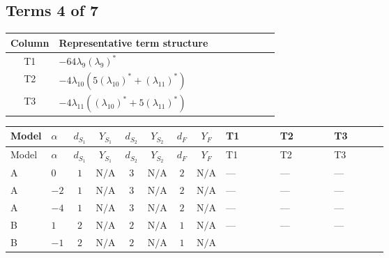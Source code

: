 \documentclass[8pt]{article}
\begin{document}
\begin{landscape}
\subsection*{Terms 4 of 7}
\begin{center}
\begin{tabular}{@{}c >{\raggedright\arraybackslash}p{0.82\linewidth}@{}}
\toprule
Column & Representative term structure \\
\midrule
T1 & \(\displaystyle -64 {\lambda_{9}} \left({\lambda_{9}}\right)^{*}\) \\
\midrule
T2 & \(\displaystyle -4 {\lambda_{10}} (5 \left({\lambda_{10}}\right)^{*}+\left({\lambda_{11}}\right)^{*})\) \\
\midrule
T3 & \(\displaystyle -4 {\lambda_{11}} (\left({\lambda_{10}}\right)^{*}+5 \left({\lambda_{11}}\right)^{*})\) \\
\midrule
\bottomrule
\end{tabular}
\end{center}
\smallskip
\tiny
\begin{longtable}{@{}llcccccc >{\raggedright\arraybackslash}p{0.21\linewidth} >{\raggedright\arraybackslash}p{0.21\linewidth} >{\raggedright\arraybackslash}p{0.21\linewidth}@{}}
\toprule
Model & $\alpha$ & $d_{S_1}$ & $Y_{S_1}$ & $d_{S_2}$ & $Y_{S_2}$ & $d_F$ & $Y_F$ & T1 & T2 & T3 \\
\midrule
\endfirsthead
\toprule
Model & $\alpha$ & $d_{S_1}$ & $Y_{S_1}$ & $d_{S_2}$ & $Y_{S_2}$ & $d_F$ & $Y_F$ & T1 & T2 & T3 \\
\midrule
\endhead
A & $0$ & $1$ & $\text{N/A}$ & $3$ & $\text{N/A}$ & $2$ & $\text{N/A}$ & --- & --- & --- \\
\midrule
A & $-2$ & $1$ & $\text{N/A}$ & $3$ & $\text{N/A}$ & $2$ & $\text{N/A}$ & --- & --- & --- \\
\midrule
A & $-4$ & $1$ & $\text{N/A}$ & $3$ & $\text{N/A}$ & $2$ & $\text{N/A}$ & --- & --- & --- \\
\midrule
B & $1$ & $2$ & $\text{N/A}$ & $2$ & $\text{N/A}$ & $1$ & $\text{N/A}$ & --- & --- & --- \\
\midrule
B & $-1$ & $2$ & $\text{N/A}$ & $2$ & $\text{N/A}$ & $1$ & $\text{N/A}$ & \scriptsize\adjustbox{max width=\linewidth}{$\begin{gathered} -64 {\lambda_{9}} \left({\lambda_{9}}\right)^{*}\end{gathered}$} & \scriptsize\adjustbox{max width=\linewidth}{$\begin{gathered} -4 {\lambda_{10}} (5 \left({\lambda_{10}}\right)^{*}+\left({\lambda_{11}}\right)^{*})\end{gathered}$} & \scriptsize\adjustbox{max width=\linewidth}{$\begin{gathered} -4 {\lambda_{11}} (\left({\lambda_{10}}\right)^{*}+5 \left({\lambda_{11}}\right)^{*})\end{gathered}$} \\

\end{longtable}
\end{landscape}
\end{document}
